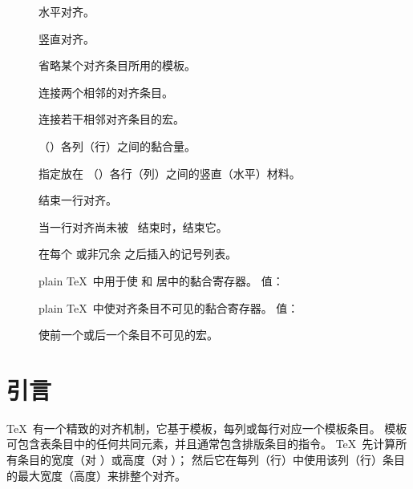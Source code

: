 \documentclass[a4paper]{rapport3}
\newenvironment{inventory}{\begin{description}}{\end{description}}
\begin{document}
\begin{inventory}
\item [] 
      水平对齐。

\item [] 
      竖直对齐。

\item [] 
      省略某个对齐条目所用的模板。

\item [] 
      连接两个相邻的对齐条目。

\item [] 
      连接若干相邻对齐条目的宏。

\item [] 
      （）各列（行）之间的黏合量。

\item [] 
      指定放在 （）各行（列）之间的竖直（水平）材料。

\item []
      结束一行对齐。

\item [] 
      当一行对齐尚未被~ 结束时，结束它。

\item [] 
      在每个  或非冗余  之后插入的记号列表。

\item [] 
      plain \TeX\ 中用于使  和  居中的黏合寄存器。
      值：

\item []
      plain \TeX\ 中使对齐条目不可见的黏合寄存器。
      值：

\item []
      使前一个或后一个条目不可见的宏。

\end{inventory}

\section{引言}

\TeX\ 有一个精致的对齐机制，它基于模板，每列或每行对应一个模板条目。
模板可包含表条目中的任何共同元素，并且通常包含排版条目的指令。
\TeX\ 先计算所有条目的宽度（对 ）或高度（对 ）；
然后它在每列（行）中使用该列（行）条目的最大宽度（高度）来排整个对齐。
\end{document}
